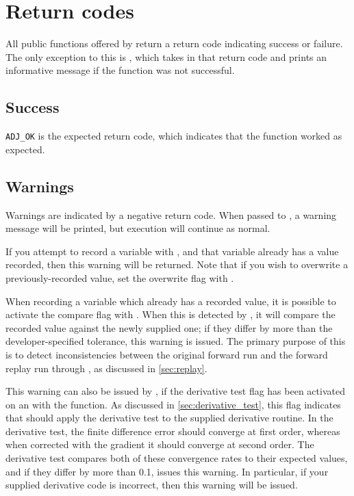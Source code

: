 \chapter{Return codes} \label{chap:return_codes}

All public functions offered by \libadjoint return a return code indicating
success or failure. The only exception to this is , which
takes in that return code and prints an informative message if the function was
not successful.

\section{Success}
\texttt{ADJ_OK} is the expected return code, which indicates that the function
worked as expected.

\section{Warnings}
Warnings are indicated by a negative return code. When passed to ,
a warning message will be printed, but execution will continue as normal.

If you attempt to record a variable with , and that variable
already has a value recorded, then this warning will be returned.
Note that if you wish to overwrite a previously-recorded value, set the overwrite flag
with .

When recording a variable which already has a recorded value, it is possible to activate the
compare flag with . When this is detected by ,
it will compare the recorded value against the newly supplied one; if they differ by more than
the developer-specified tolerance, this warning is issued. The primary purpose of this is to detect
inconsistencies between the original forward run and the forward replay run through \libadjoint,
as discussed in \autoref{sec:replay}.

This warning can also be issued by ,
if the derivative test flag has been activated on an  with the  function.
As discussed in \autoref{sec:derivative_test}, this flag indicates that \libadjoint should apply the derivative
test to the supplied derivative routine. In the derivative test, the finite difference error should converge
at first order, whereas when corrected with the gradient it should converge at second order. The derivative test
compares both of these convergence rates to their expected values, and if they differ by more than 0.1, issues this warning.
In particular, if your supplied derivative code is incorrect, then this warning will be issued.

